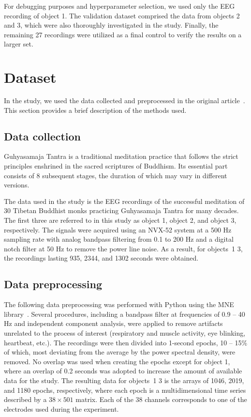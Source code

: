 \documentclass[10pt]{iopart}
\begin{document}
For debugging purposes and hyperparameter selection, we used only the EEG recording of object 1. The validation dataset comprised the data from objects 2 and 3, which were also thoroughly investigated in the study. Finally, the remaining 27 recordings were utilized as a final control to verify the results on a larger set. 

\section{Dataset}

In the study, we used the data collected and preprocessed in the original article~\cite{SDA}. This section provides a brief description of the methods used.

\subsection{Data collection}

Guhyasamaja Tantra is a traditional meditation practice that follows the strict principles enshrined in the sacred scriptures of Buddhism. Its essential part consists of 8 subsequent stages, the duration of which may vary in different versions.

The data used in the study is the EEG recordings of the successful meditation of 30 Tibetan Buddhist monks practicing Guhyasamaja Tantra for many decades. The first three are referred to in this study as object 1, object 2, and object 3, respectively. The signals were acquired using an NVX-52 system at a 500 Hz sampling rate with analog bandpass filtering from 0.1 to 200 Hz and a digital notch filter at 50 Hz to remove the power line noise. As a result, for objects~1 3, the recordings lasting 935, 2344, and 1302 seconds were obtained.

\subsection{Data preprocessing}

The following data preprocessing was performed with Python using the MNE library~\cite{MNE}. Several procedures, including a bandpass filter at frequencies of 0.9 -- 40 Hz and independent component analysis, were applied to remove artifacts unrelated to the process of interest (respiratory and muscle activity, eye blinking, heartbeat, etc.). The recordings were then divided into 1-second epochs, 10 -- 15\% of which, most deviating from the average by the power spectral density, were removed. No overlap was used when creating the epochs except for object 1, where an overlap of 0.2 seconds was adopted to increase the amount of available data for the study. The resulting data for objects~1 3 is the arrays of 1046, 2019, and 1180 epochs, respectively, where each epoch is a multidimensional time series described by a $38\times501$ matrix. Each of the 38 channels corresponds to one of the electrodes used during the experiment.
\end{document}
